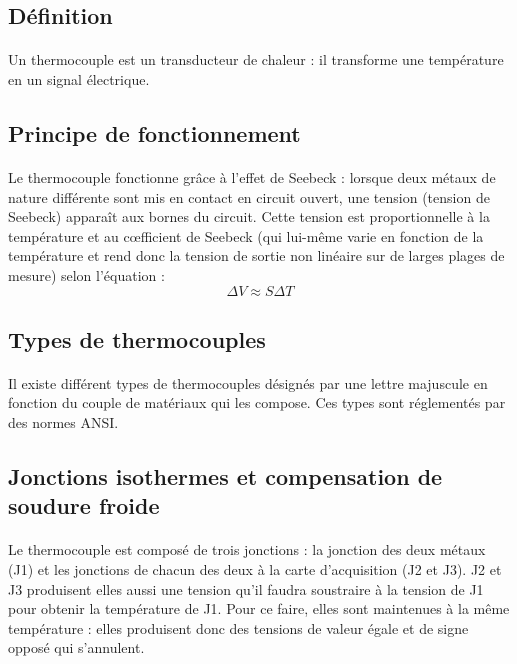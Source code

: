 \documentclass{article}
\begin{document}
\subsection{Définition}
\paragraph{}
Un thermocouple est un transducteur de chaleur : il transforme une température en un signal électrique.

\subsection{Principe de fonctionnement}
\paragraph{}
Le thermocouple fonctionne grâce à l'effet de Seebeck : lorsque deux métaux de nature différente sont mis en contact en circuit ouvert, une tension (tension de Seebeck) apparaît aux bornes du circuit. Cette tension est proportionnelle à la température et au c\oe fficient de Seebeck (qui lui-même varie en fonction de la température et rend donc la tension de sortie non linéaire sur de larges plages de mesure) selon l'équation : $$\Delta V \approx S \Delta T$$

\subsection{Types de thermocouples}
\paragraph{}
Il existe différent types de thermocouples désignés par une lettre majuscule en fonction du couple de matériaux qui les compose. Ces types sont réglementés par des normes ANSI.

\subsection{Jonctions isothermes et compensation de soudure froide}
\paragraph{}
Le thermocouple est composé de trois jonctions : la jonction des deux métaux (J1) et les jonctions de chacun des deux à la carte d'acquisition (J2 et J3). J2 et J3 produisent elles aussi une tension qu'il faudra soustraire à la tension de J1 pour obtenir la température de J1. Pour ce faire, elles sont maintenues à la même température : elles produisent donc des tensions de valeur égale et de signe opposé qui s'annulent.
\end{document}
